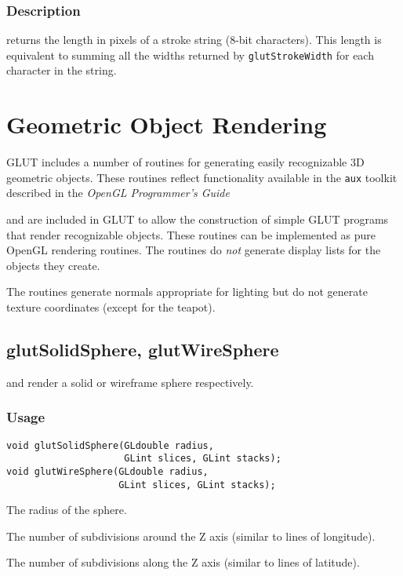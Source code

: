 \subsubsection*{Description}

returns the length in pixels of a stroke
string (8-bit characters).  This length is equivalent to
summing all the widths returned by {\tt glutStrokeWidth} for each
character in the string.

\section{Geometric Object Rendering}

GLUT includes a number of routines for generating easily recognizable 3D geometric
objects.  These routines reflect functionality available in the {\tt aux} toolkit described in the {\em OpenGL Programmer's Guide}

and are included in GLUT to allow the construction of simple GLUT programs that
render recognizable objects.  These routines can be implemented as pure OpenGL
rendering routines.
The routines do {\em not} generate display lists for the objects they create.

The routines generate normals appropriate for lighting but do not generate
texture coordinates (except for the teapot).

\subsection{glutSolidSphere, glutWireSphere}

 and  render a solid or wireframe
sphere respectively.

\subsubsection*{Usage}
\begin{verbatim}
void glutSolidSphere(GLdouble radius,
                     GLint slices, GLint stacks);
void glutWireSphere(GLdouble radius,
                    GLint slices, GLint stacks);
\end{verbatim}
\begin{description}
\itemsep 0in
\item[{\tt radius}]
The radius of the sphere.
\item[{\tt slices}]
The number of subdivisions around the Z axis (similar to lines of longitude).
\item[{\tt stacks}]
The number of subdivisions along the Z axis (similar to lines of latitude).
\end{description}

